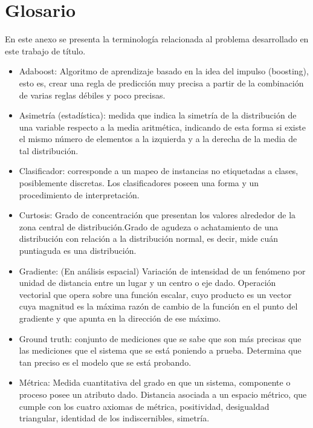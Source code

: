 \chapter{Glosario}
\label{cap:glosario}

En este anexo se presenta la terminología relacionada al problema desarrollado en este trabajo de título.

\begin{itemize}

\item Adaboost: Algoritmo de aprendizaje basado en la idea del impulso (boosting), esto es, crear una regla de predicción muy precisa a partir de la combinación de varias reglas débiles y poco precisas.

\item Asimetría (estadística): medida que indica la simetría de la distribución de una variable respecto a la media aritmética, indicando de esta forma si existe el mismo número de elementos a la izquierda y a la derecha de la media de tal distribución. 

\item Clasificador: corresponde a un mapeo de instancias no etiquetadas a clases, posiblemente discretas. Los clasificadores poseen una forma y un procedimiento de interpretación.

\item Curtosis: Grado de concentración que presentan los valores alrededor de la zona central de distribución.Grado de agudeza o achatamiento de una distribución con relación a la distribución normal, es decir, mide cuán puntiaguda es una distribución.

\item Gradiente: (En análisis espacial) Variación de intensidad de un fenómeno por unidad de distancia entre un lugar y un centro o eje dado. Operación vectorial que opera sobre una función escalar, cuyo producto es un vector cuya magnitud es la máxima razón de cambio de la función en el punto del gradiente y que apunta en la dirección de ese máximo.

\item Ground truth: conjunto de mediciones que se sabe que son más precisas que las mediciones que el sistema que se está poniendo a prueba. Determina que tan preciso es el modelo que se está probando.

\item Métrica: Medida cuantitativa del grado en que un sistema, componente o proceso posee un atributo dado. Distancia asociada a un espacio métrico, que cumple con los cuatro axiomas de métrica, positividad, desigualdad triangular, identidad de los indiscernibles, simetría. 


\end{itemize}
